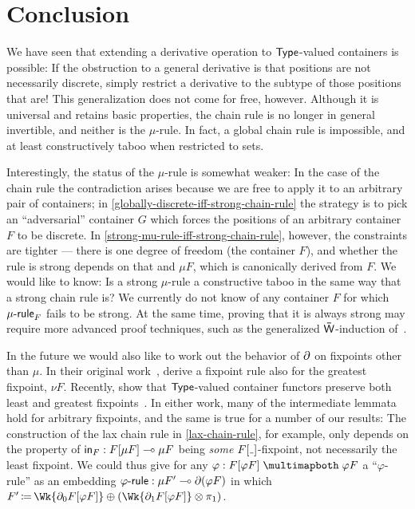 \section{Conclusion}

We have seen that extending a derivative operation to \( \operatorname{\mathsf{Type}} \)-valued containers is possible:
If the obstruction to a general derivative is that positions are not necessarily discrete,
simply restrict a derivative to the subtype of those positions that are!
This generalization does not come for free, however.
Although it is universal and retains basic properties, the chain rule is no longer in general invertible,
and neither is the \( \mu \)-rule.
In fact, a global chain rule is impossible, and at least constructively taboo when restricted to sets.

Interestingly, the status of the \( \mu \)-rule is somewhat weaker:
In the case of the chain rule the contradiction arises because we are free to apply it to an arbitrary pair of containers;
in \autoref{globally-discrete-iff-strong-chain-rule} the strategy is to pick an \enquote{adversarial}
container \( G \) which forces the positions of an arbitrary container \( F \) to be discrete.
In \autoref{strong-mu-rule-iff-strong-chain-rule}, however, the constraints are tighter
---
there is one degree of freedom (the container \( F \)),
and whether the rule is strong depends on that and \( \mu F \),
which is canonically derived from \( F \).
We would like to know:
Is a strong \( \mu \)-rule a constructive taboo in the same way that a strong chain rule is?
We currently do not know of any container \( F \) for which \( \operatorname{\mathsf{\mu-rule}}_F \) fails to be strong.
At the same time, proving that it is always strong may require more advanced proof techniques,
such as the generalized \( \WPath \)-induction of~\cite[Lemma~12]{DamatoEtAl2025FormalisingInductiveCoinductive}.

In the future we would also like to work out the behavior of \( \partial \) on fixpoints other than \( \mu \).
In their original work~\cite{AbbottEtAl2005DataDifferentiating}, \citeauthor{AbbottEtAl2005DataDifferentiating} derive a fixpoint rule also for the greatest fixpoint, \( \nu F \).
Recently, \citeauthor{DamatoEtAl2025FormalisingInductiveCoinductive} show that \( \operatorname{\mathsf{Type}} \)-valued container functors preserve both least and greatest fixpoints~\cite{DamatoEtAl2025FormalisingInductiveCoinductive}.
In either work, many of the intermediate lemmata hold for arbitrary fixpoints,
and the same is true for a number of our results:
The construction of the lax chain rule in \autoref{lax-chain-rule}, for example, only depends on the property of \( \operatorname{\mathsf{in}}_F : F\lbrack\mu F\rbrack\mathrel{\multimap}\mu F \) being \emph{some}
\( \Subst{F}{\Blank} \)-fixpoint, not necessarily the least fixpoint.
We could thus give for any \( \varphi : \CartIso{\Subst{F}{\varphi F}}{\varphi F} \) a \enquote{\( \varphi \)-rule}
as an embedding \( \operatorname{\mathsf{\varphi-rule}} : \mu F'\mathrel{\multimap}\partial(\varphi F) \) in which
\(
  F' \DefEq
    { \Wk{\Der_0{F}[ {\varphi F} ]} }
      \CPlus
    (
      \Wk{\Der_1{F}[ {\varphi F} ]}
        \CTimes
      \Proj{1}
    )
\).

